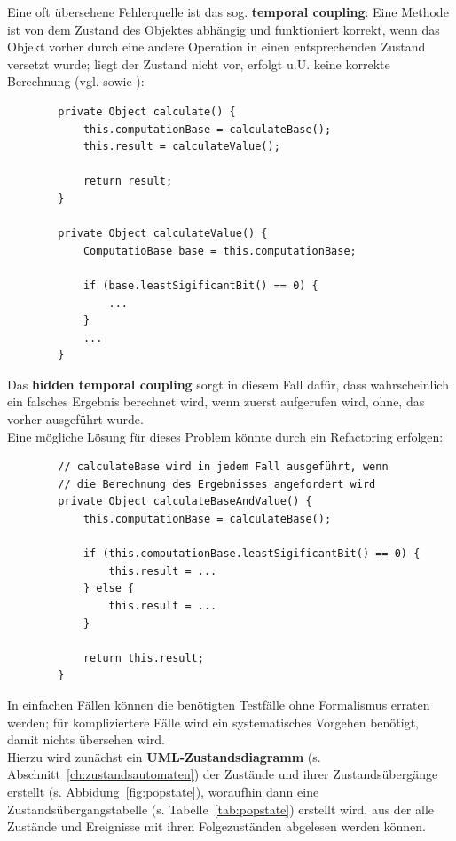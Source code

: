\begin{tcolorbox}[colback=white]
    Eine oft übersehene Fehlerquelle ist das sog. \textbf{temporal coupling}: Eine Methode ist von dem Zustand des Objektes abhängig und funktioniert korrekt, wenn das Objekt vorher durch eine andere Operation in einen entsprechenden Zustand versetzt wurde; liegt der Zustand nicht vor, erfolgt u.U. keine korrekte Berechnung (vgl.\cite[44 f.]{Mar08} sowie \cite[259]{Mar08}):

    \begin{verbatim}
        private Object calculate() {
            this.computationBase = calculateBase();
            this.result = calculateValue();

            return result;
        }

        private Object calculateValue() {
            ComputatioBase base = this.computationBase;

            if (base.leastSigificantBit() == 0) {
                ...
            }
            ...
        }
    \end{verbatim}

    \noindent
    Das \textbf{hidden temporal coupling} sorgt in diesem Fall dafür, dass wahrscheinlich ein falsches Ergebnis berechnet wird, wenn zuerst  aufgerufen wird, ohne, das vorher  ausgeführt wurde.\\

     \noindent
     Eine mögliche Lösung für dieses Problem könnte durch ein Refactoring erfolgen:
    \begin{verbatim}
        // calculateBase wird in jedem Fall ausgeführt, wenn
        // die Berechnung des Ergebnisses angefordert wird
        private Object calculateBaseAndValue() {
            this.computationBase = calculateBase();

            if (this.computationBase.leastSigificantBit() == 0) {
                this.result = ...
            } else {
                this.result = ...
            }

            return this.result;
        }
    \end{verbatim}
\end{tcolorbox}


\noindent
In einfachen Fällen können die benötigten Testfälle ohne Formalismus erraten werden; für kompliziertere Fälle wird ein systematisches Vorgehen benötigt, damit nichts übersehen wird.\\
Hierzu wird zunächst ein \textbf{UML-Zustandsdiagramm} (s. Abschnitt~\ref{ch:zustandsautomaten}) der Zustände und ihrer Zustandsübergänge erstellt (s. Abbidung~\ref{fig:popstate}), woraufhin dann eine Zustandsübergangstabelle (s. Tabelle~\ref{tab:popstate}) erstellt wird, aus der alle Zustände und Ereignisse mit ihren Folgezuständen abgelesen werden können.


